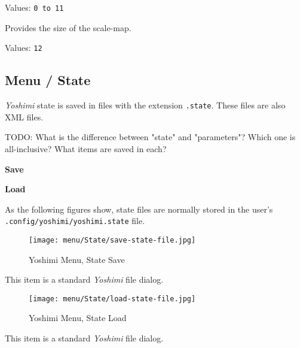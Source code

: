    Values: \texttt{0 to 11}

   Provides the size of the scale-map.

   Values: \texttt{12}

\subsection{Menu / State}
\label{subsec:menu_state}

   \textsl{Yoshimi} state is saved in files with the extension
   \texttt{.state}.  These files are also XML files.

   TODO: What is the difference between "state" and "parameters"?
   Which one is all-inclusive?  What items are saved in each?

   \begin{enumber}
      \item \textbf{Save}
      \item \textbf{Load}
   \end{enumber}

   As the following figures show, state files are normally stored in the
   user's \texttt{.config/yoshimi/yoshimi.state} file.

\begin{figure}[H]
   \centering 
   \texttt{[image: menu/State/save-state-file.jpg]}
   \caption{Yoshimi Menu, State Save}
   \label{fig:yoshimi_menu_state_save}
\end{figure}

   This item is a standard \textsl{Yoshimi} file dialog.

\begin{figure}[H]
   \centering 
   \texttt{[image: menu/State/load-state-file.jpg]}
   \caption{Yoshimi Menu, State Load}
   \label{fig:yoshimi_menu_state_load}
\end{figure}

   This item is a standard \textsl{Yoshimi} file dialog.


